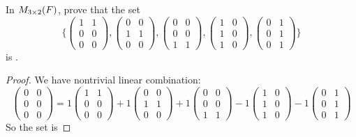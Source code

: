 \begin{exercise} \label{exercise 1.5.3}
In \(M_{3 \times 2}(F)\), prove that the set
\[
\Bigg\{
    \begin{pmatrix}
        1 & 1 \\
        0 & 0 \\
        0 & 0
    \end{pmatrix},
    \begin{pmatrix}
        0 & 0 \\
        1 & 1 \\
        0 & 0
    \end{pmatrix},
    \begin{pmatrix}
        0 & 0 \\
        0 & 0 \\
        1 & 1
    \end{pmatrix},
    \begin{pmatrix}
        1 & 0 \\
        1 & 0 \\
        1 & 0
    \end{pmatrix},
    \begin{pmatrix}
        0 & 1 \\
        0 & 1 \\
        0 & 1
    \end{pmatrix}
\Bigg\}
\]
is \LDP{}.
\end{exercise}

\begin{proof}
We have nontrivial linear combination:
\[
    \begin{pmatrix}
        0 & 0 \\
        0 & 0 \\
        0 & 0
    \end{pmatrix}
    = 1 \begin{pmatrix}
        1 & 1 \\
        0 & 0 \\
        0 & 0
    \end{pmatrix}
    + 1 \begin{pmatrix}
        0 & 0 \\
        1 & 1 \\
        0 & 0
    \end{pmatrix}
    + 1 \begin{pmatrix}
        0 & 0 \\
        0 & 0 \\
        1 & 1
    \end{pmatrix}
    - 1 \begin{pmatrix}
        1 & 0 \\
        1 & 0 \\
        1 & 0
    \end{pmatrix}
    - 1 \begin{pmatrix}
        0 & 1 \\
        0 & 1 \\
        0 & 1
    \end{pmatrix}
\]
So the set is \LDP{}
\end{proof}


